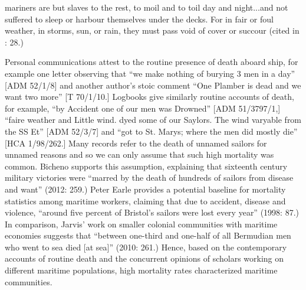 mariners are but slaves to the rest, to moil and to toil day and night...and not suffered to sleep or harbour themselves under the decks. For in fair or foul weather, in storms, sun, or rain, they must pass void of cover or succour (cited in \citealt{Lavery2009}: 28.) 

Personal communications attest to the routine presence of death aboard ship, for example one letter observing that “we make nothing of burying 3 men in a day” [ADM 52/1/8] and another author’s stoic comment “One Plamber is dead and we want two more” [T 70/1/10.] Logbooks give similarly routine accounts of death, for example, “by Accident one of our men was Drowned” [ADM 51/3797/1,] “faire weather and Little wind. dyed some of our Saylors. The wind varyable from the SS Et” [ADM 52/3/7] and “got to St. Marys; where the men did mostly die” [HCA 1/98/262.] Many records refer to the death of unnamed sailors for unnamed reasons and so we can only assume that such high mortality was common. Bicheno supports this assumption, explaining that sixteenth century military victories were “marred by the death of hundreds of sailors from disease and want” (2012: 259.) Peter Earle provides a potential baseline for mortality statistics among maritime workers, claiming that due to accident, disease and violence, “around five percent of Bristol’s sailors were lost every year” (1998: 87.) In comparison, Jarvis’ work on smaller colonial communities with maritime economies suggests that “between one-third and one-half of all Bermudian men who went to sea died [at sea]” (2010: 261.) Hence, based on the contemporary accounts of routine death and the concurrent opinions of scholars working on different maritime populations, high mortality rates characterized maritime communities. 

